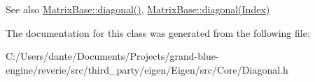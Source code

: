 \begin{DoxySeeAlso}{See also}
\mbox{\hyperlink{class_eigen_1_1_matrix_base_ab5768147536273eb2dbdfa389cfd26a3}{Matrix\+Base\+::diagonal()}}, \mbox{\hyperlink{class_eigen_1_1_matrix_base_a8a13d4b8efbd7797ee8efd3dd988a7f7}{Matrix\+Base\+::diagonal(\+Index)}} 
\end{DoxySeeAlso}


The documentation for this class was generated from the following file\+:\begin{DoxyCompactItemize}
\item 
C\+:/\+Users/dante/\+Documents/\+Projects/grand-\/blue-\/engine/reverie/src/third\+\_\+party/eigen/\+Eigen/src/\+Core/Diagonal.\+h\end{DoxyCompactItemize}
